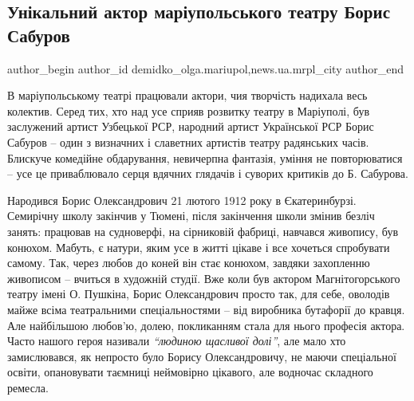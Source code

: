  
 
 
 
 
 
\subsection{Унікальний актор маріупольського театру Борис Сабуров}
\label{sec:13_12_2018.stz.news.ua.mrpl_city.1.unikalnyj_aktor_borys_saburov}
 
\ifcmt
 author_begin
   author_id demidko_olga.mariupol,news.ua.mrpl_city
 author_end
\fi

В маріупольському театрі працювали актори, чия творчість надихала весь
колектив. Серед тих, хто над усе сприяв розвитку театру в Маріуполі, був
заслужений артист Узбецької РСР, народний артист Української РСР Борис Сабуров
– один з визначних і славетних артистів театру радянських часів. Блискуче
комедійне обдарування, невичерпна фантазія, уміння не повторюватися – усе це
приваблювало серця вдячних глядачів і суворих критиків до Б. Сабурова.

Народився Борис Олександрович 21 лютого 1912 року в Єкатеринбурзі. Семирічну
школу закінчив у Тюмені, після закінчення школи змінив безліч занять: працював
на судноверфі, на сірниковій фабриці, навчався живопису, був конюхом. Мабуть, є
натури, яким усе в житті цікаве і все хочеться спробувати самому. Так, через
любов до коней він стає конюхом, завдяки захопленню живописом – вчиться в
художній студії. Вже коли був актором Магнітогорського театру імені О. Пушкіна,
Борис Олександрович просто так, для себе, оволодів майже всіма театральними
спеціальностями – від виробника бутафорії до кравця. Але найбільшою любов'ю,
долею, покликанням стала для нього професія актора. Часто нашого героя називали
\emph{\enquote{людиною щасливої долі}}, але мало хто замислювався, як непросто
було Борису Олександровичу, не маючи спеціальної освіти, опановувати таємниці
неймовірно цікавого, але водночас складного ремесла.

